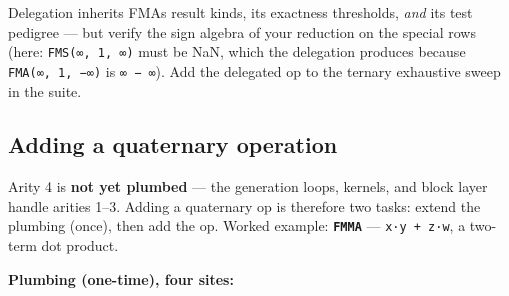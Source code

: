 Delegation inherits FMA{\textquotesingle}s result kinds, its exactness thresholds, \emph{and} its test pedigree — but verify the sign algebra of your reduction on the special rows (here: \texttt{FMS(∞, 1, ∞)} must be NaN, which the delegation produces because \texttt{FMA(∞, 1, −∞)} is \texttt{∞ − ∞}). Add the delegated op to the ternary exhaustive sweep in the suite.



\subsection{Adding a quaternary operation}



\label{1028380857650662652}{}


Arity 4 is \textbf{not yet plumbed} — the generation loops, kernels, and block layer handle arities 1–3. Adding a quaternary op is therefore two tasks: extend the plumbing (once), then add the op. Worked example: \textbf{\texttt{FMMA}} — \texttt{x·y + z·w}, a two-term dot product.



\textbf{Plumbing (one-time), four sites:}



